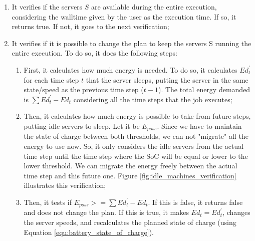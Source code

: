 \begin{enumerate}
    \item It verifies if the servers $S$ are available during the entire execution, considering the walltime given by the user as the execution time. If so, it returns true. If not, it goes to the next verification;
    \item It verifies if it is possible to change the plan to keep the servers S running the entire execution. To do so, it does the following steps:
    \begin{enumerate}
        \item First, it calculates how much energy is needed. To do so, it calculates $Ed_t^{'}$ for each time step $t$ that the server sleeps, putting the server in the same state/speed as the previous time step ($t-1$). The total energy demanded is $\sum Ed_t^{'} - Ed_t$ considering all the time steps that the job executes;
        \item Then, it calculates how much energy is possible to take from future steps, putting idle servers to sleep. Let it be $E_{poss}$. Since we have to maintain the state of charge between both thresholds, we can not "migrate" all the energy to use now. So, it only considers the idle servers from the actual time step until the time step where the SoC will be equal or lower to the lower threshold. We can migrate the energy freely between the actual time step and this future one. Figure \ref{fig:idle_machines_verification} illustrates this verification;
        \item Then, it tests if $E_{poss} >= \sum Ed_t^{'} - Ed_t$. If this is false, it returns false and does not change the plan. If this is true, it makes $Ed_t = Ed_t^{'}$, changes the server speeds, and recalculates the planned state of charge (using Equation \ref{equ:battery_state_of_charge}).
    \end{enumerate}
\end{enumerate}

